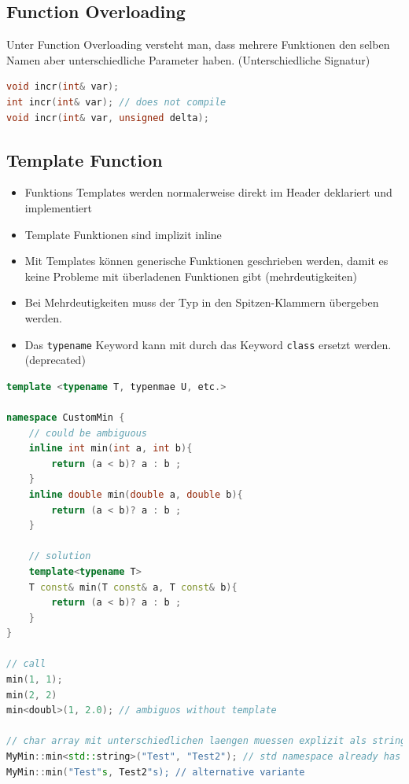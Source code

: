 \subsection{Function Overloading}
Unter Function Overloading versteht man, dass mehrere Funktionen den selben Namen aber unterschiedliche Parameter haben. (Unterschiedliche Signatur)
\begin{lstlisting}[language=C++]
void incr(int& var);
int incr(int& var); // does not compile
void incr(int& var, unsigned delta);
\end{lstlisting}

\subsection{Template Function}
\begin{itemize}
	\item Funktions Templates werden normalerweise direkt im Header deklariert und implementiert
	\item Template Funktionen sind implizit inline
	\item Mit Templates können generische Funktionen geschrieben werden, damit es keine Probleme mit überladenen Funktionen gibt (mehrdeutigkeiten)
	\item Bei Mehrdeutigkeiten muss der Typ in den Spitzen-Klammern übergeben werden.
	\item Das \lstinline|typename| Keyword kann mit durch das Keyword \lstinline|class| ersetzt werden. (deprecated)
\end{itemize}
\begin{lstlisting}[language=C++]
template <typename T, typenmae U, etc.>

namespace CustomMin {
	// could be ambiguous
	inline int min(int a, int b){
		return (a < b)? a : b ;
	}
	inline double min(double a, double b){
		return (a < b)? a : b ;
	}
	
	// solution
	template<typename T> 
	T const& min(T const& a, T const& b){
		return (a < b)? a : b ;
	}
}

// call
min(1, 1);
min(2, 2)
min<doubl>(1, 2.0); // ambiguos without template

// char array mit unterschiedlichen laengen muessen explizit als string verglichen werden
MyMin::min<std::string>("Test", "Test2"); // std namespace already has a min function
MyMin::min("Test"s, Test2"s); // alternative variante
\end{lstlisting}


